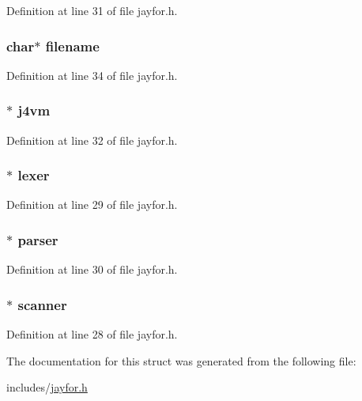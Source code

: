 Definition at line 31 of file jayfor.\+h.

\hypertarget{structjayfor_aeac90097f29f7529968697163cea5c18}{
\subsubsection[{filename}]{\setlength{\rightskip}{0pt plus 5cm}char$\ast$ filename}}\label{structjayfor_aeac90097f29f7529968697163cea5c18}


Definition at line 34 of file jayfor.\+h.

\hypertarget{structjayfor_ac3106705d25b5b4851814aef6c7eafeb}{
\subsubsection[{j4vm}]{$\ast$ j4vm}}\label{structjayfor_ac3106705d25b5b4851814aef6c7eafeb}


Definition at line 32 of file jayfor.\+h.

\hypertarget{structjayfor_af49cfd254ef2d555a0cc3ddcf0d8153d}{
\subsubsection[{lexer}]{$\ast$ lexer}}\label{structjayfor_af49cfd254ef2d555a0cc3ddcf0d8153d}


Definition at line 29 of file jayfor.\+h.

\hypertarget{structjayfor_a8b50a631b24993a9524758c8e8842c6b}{
\subsubsection[{parser}]{$\ast$ {\bf parser}}}\label{structjayfor_a8b50a631b24993a9524758c8e8842c6b}


Definition at line 30 of file jayfor.\+h.

\hypertarget{structjayfor_a802fe0f3060d87eba0e91c8c48046e76}{
\subsubsection[{scanner}]{$\ast$ scanner}}\label{structjayfor_a802fe0f3060d87eba0e91c8c48046e76}


Definition at line 28 of file jayfor.\+h.



The documentation for this struct was generated from the following file\+:\begin{DoxyCompactItemize}
\item 
includes/\hyperlink{jayfor_8h}{jayfor.\+h}\end{DoxyCompactItemize}
